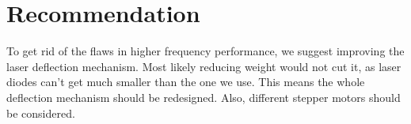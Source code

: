 \section*{Recommendation}
To get rid of the flaws  in higher frequency performance, we suggest improving
the laser deflection mechanism. Most likely  reducing weight would not cut it,
as laser diodes can’t  get much smaller than the one  we use. This means the
whole  deflection  mechanism  should be  redesigned. Also,  different  stepper
motors should be considered.
